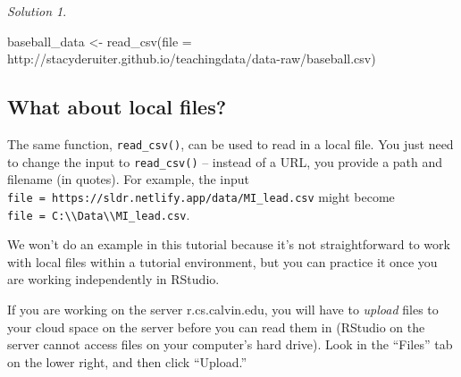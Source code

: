 \documentclass[
  letterpaper,
  DIV=11,
  numbers=noendperiod]{scrreprt}
\newenvironment{Shaded}{\begin{snugshade}}{\end{snugshade}}
\newcommand{\AttributeTok}[1]{\textcolor[rgb]{0.40,0.45,0.13}{#1}}
\newcommand{\FunctionTok}[1]{\textcolor[rgb]{0.28,0.35,0.67}{#1}}
\newcommand{\NormalTok}[1]{\textcolor[rgb]{0.00,0.23,0.31}{#1}}
\newcommand{\OtherTok}[1]{\textcolor[rgb]{0.00,0.23,0.31}{#1}}
\newcommand{\StringTok}[1]{\textcolor[rgb]{0.13,0.47,0.30}{#1}}
\theoremstyle{remark}
\newtheorem*{solution}{Solution}
\begin{document}
\begin{solution}
\leavevmode

\begin{tcolorbox}[enhanced jigsaw, colbacktitle=quarto-callout-note-color!10!white, opacitybacktitle=0.6, titlerule=0mm, left=2mm, leftrule=.75mm, toptitle=1mm, toprule=.15mm, rightrule=.15mm, title=\textcolor{quarto-callout-note-color}{\faInfo}\hspace{0.5em}{Solution}, colback=white, arc=.35mm, colframe=quarto-callout-note-color-frame, bottomrule=.15mm, breakable, bottomtitle=1mm, opacityback=0, coltitle=black]

\begin{Shaded}
\begin{Highlighting}[]
\NormalTok{baseball\_data }\OtherTok{\textless{}{-}} \FunctionTok{read\_csv}\NormalTok{(}\AttributeTok{file =} \StringTok{\textquotesingle{}http://stacyderuiter.github.io/teachingdata/data{-}raw/baseball.csv\textquotesingle{}}\NormalTok{)}
\end{Highlighting}
\end{Shaded}

\end{tcolorbox}

\end{solution}

\subsection{What about local files?}\label{what-about-local-files}

The same function, \texttt{read\_csv()}, can be used to read in a local
file. You just need to change the input to \texttt{read\_csv()} --
instead of a URL, you provide a path and filename (in quotes). For
example, the input
\texttt{file\ =\ \textquotesingle{}https://sldr.netlify.app/data/MI\_lead.csv\textquotesingle{}}
might become
\texttt{file\ =\ \textquotesingle{}C:\textbackslash{}\textbackslash{}Data\textbackslash{}\textbackslash{}MI\_lead.csv\textquotesingle{}}.

We won't do an example in this tutorial because it's not straightforward
to work with local files within a tutorial environment, but you can
practice it once you are working independently in RStudio.

If you are working on the server r.cs.calvin.edu, you will have to
\emph{upload} files to your cloud space on the server before you can
read them in (RStudio on the server cannot access files on your
computer's hard drive). Look in the ``Files'' tab on the lower right,
and then click ``Upload.''
\end{document}
